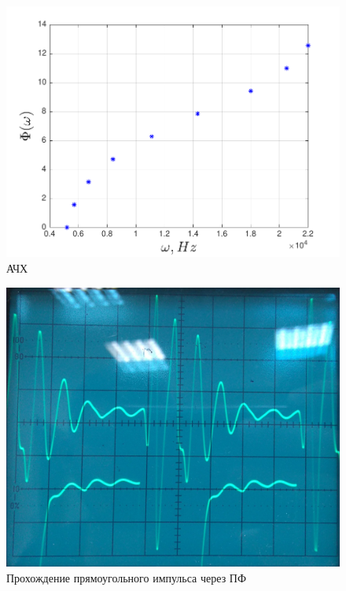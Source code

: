 \begin{figure}[H]
	\centering
	\includegraphics[scale=0.9]{graph/graph6}
	\caption{АЧХ}
	\label{fig:figure6}
\end{figure}





\begin{figure}[H]
	\centering
	\includegraphics[scale=0.25]{images/2}
	\caption{Прохождение прямоугольного импульса через ПФ}
	\label{fig:ris2}
\end{figure}



